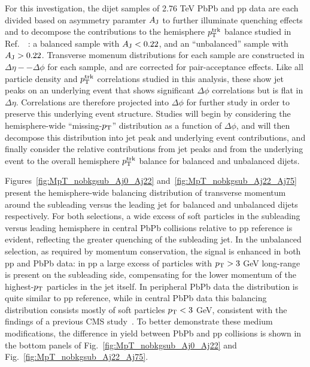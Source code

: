 For this investigation, the dijet samples of 2.76 TeV PbPb and pp data are each divided based on asymmetry paramter $A_{\rm J}$ to further illuminate quenching effects and to decompose the contributions to the hemisphere $p_{\rm T}^{\rm trk}$ balance studied in Ref.~~\cite{HIN_2014_010}:  a balanced sample with $A_{\rm J} < 0.22$, and an ``unbalanced'' sample with $A_{\rm J} > 0.22$.  Transverse momenum distributions for each sample are constructed in $\Delta\eta--\Delta\phi$ for each sample, and are corrected for pair-acceptance effects.  Like all particle density and $p_{\rm T}^{\rm trk}$ correlations studied in this analysis, these show jet peaks on an underlying event that shows significant $\Delta\phi$ correlations but is flat in $\Delta\eta$.  Correlations are therefore projected into $\Delta\phi$ for further study in order to preserve this underlying event structure.  Studies will begin by considering the hemisphere-wide ``missing-$p_{\rm T}$'' distribution as a function of $\Delta\phi$, and will then decompose this distribution into jet peak and underlying event contributions, and finally consider the relative contributions from jet peaks and from the underlying event to the overall hemisphere $p_{\rm T}^{\rm trk}$ balance for balanced and unbalanced dijets.   

Figures~\ref{fig:MpT_nobkgsub_Aj0_Aj22} and~\ref{fig:MpT_nobkgsub_Aj22_Aj75} present the hemisphere-wide balancing distribution of transverse momentum around the subleading versus the leading jet for balanced and unbalanced dijets respectively.  For both selections, a wide excess of soft particles in the subleading versus leading hemisphere in central PbPb collisions relative to pp reference is evident, reflecting the greater quenching of the subleading jet.  In the unbalanced selection, as required by momentum conservation, the signal is enhanced in both pp and PbPb data:  in pp a large excess of particles with $p_{\rm T}>3$ GeV long-range is present on the subleading side, compensating for the lower momentum of the highest-$p_{\rm T}$ particles in the jet itself.  In peripheral PbPb data the distribution is quite similar to pp reference, while in central PbPb data this balancing distribution consists mostly of soft particles $p_{\rm T}<3$ GeV, consistent with the findings of a previous CMS study~\cite{HIN_2014_010}.  To better demonstrate these medium modifications, the difference in yield between PbPb and pp collisions is shown in the bottom panels of Fig.~\ref{fig:MpT_nobkgsub_Aj0_Aj22} and Fig.~\ref{fig:MpT_nobkgsub_Aj22_Aj75}.

